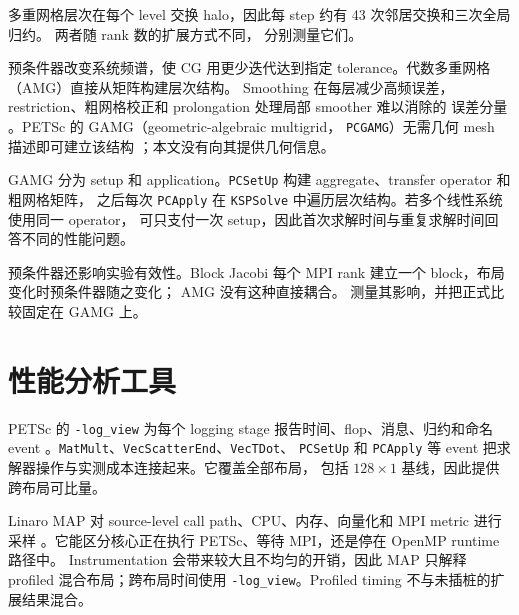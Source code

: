 \documentclass[11pt,a4paper,oneside]{report}
\begin{document}

多重网格层次在每个 level 交换 halo，因此每 step 约有 43 次邻居交换和三次全局归约。
两者随 rank 数的扩展方式不同， 分别测量它们。

预条件器改变系统频谱，使 CG 用更少迭代达到指定 tolerance。代数多重网格（AMG）直接从矩阵构建层次结构。
Smoothing 在每层减少高频误差，restriction、粗网格校正和 prolongation 处理局部 smoother 难以消除的
误差分量 \cite{stuben2001amg}。PETSc 的 GAMG（geometric-algebraic multigrid，
\texttt{PCGAMG}）无需几何 mesh 描述即可建立该结构 \cite{petsc_manual_324}；本文没有向其提供几何信息。

GAMG 分为 setup 和 application。\texttt{PCSetUp} 构建 aggregate、transfer operator 和粗网格矩阵，
之后每次 \texttt{PCApply} 在 \texttt{KSPSolve} 中遍历层次结构。若多个线性系统使用同一 operator，
可只支付一次 setup，因此首次求解时间与重复求解时间回答不同的性能问题。

预条件器还影响实验有效性。Block Jacobi 每个 MPI rank 建立一个 block，布局变化时预条件器随之变化；
AMG 没有这种直接耦合。 测量其影响，并把正式比较固定在 GAMG 上。

\section{性能分析工具}
\label{sec:tools}
PETSc 的 \texttt{-log\_view} 为每个 logging stage 报告时间、flop、消息、归约和命名 event
\cite{petsc_manual_324}。\texttt{MatMult}、\texttt{VecScatterEnd}、\texttt{VecTDot}、
\texttt{PCSetUp} 和 \texttt{PCApply} 等 event 把求解器操作与实测成本连接起来。它覆盖全部布局，
包括 $128\times1$ 基线，因此提供跨布局可比量。

Linaro MAP 对 source-level call path、CPU、内存、向量化和 MPI metric 进行采样
\cite{linaro_map_2504}。它能区分核心正在执行 PETSc、等待 MPI，还是停在 OpenMP runtime 路径中。
Instrumentation 会带来较大且不均匀的开销，因此 MAP 只解释 profiled 混合布局；跨布局时间使用
\texttt{-log\_view}。Profiled timing 不与未插桩的扩展结果混合。
\end{document}
